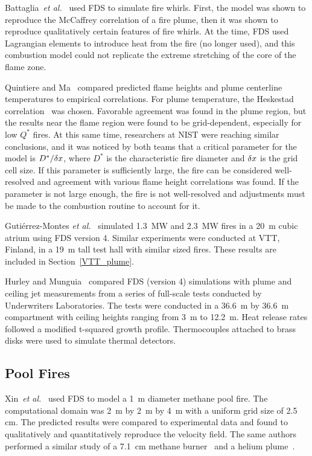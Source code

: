 Battaglia~{\em et al.}~\cite{Battaglia:1} used FDS to simulate fire whirls.  First, the model was shown to reproduce the McCaffrey correlation of a fire plume,  then it was shown to reproduce qualitatively certain features of fire whirls. At the time, FDS used Lagrangian elements to introduce heat from the fire (no longer used), and this combustion model could not replicate the extreme stretching of the core of the flame zone.

Quintiere and Ma~\cite{Ma:2,Ma:3} compared predicted flame heights and plume centerline temperatures to empirical correlations.  For plume temperature,  the Heskestad  correlation~\cite{SFPE:Heskestad} was chosen. Favorable agreement was found in the plume region, but the results near the flame region were found to be grid-dependent, especially for low $Q^*$ fires. At this same time, researchers at NIST were reaching similar conclusions, and it was noticed by both teams that a critical parameter for the model is $D^*/\delta x$, where $D^*$ is the characteristic fire diameter and $\delta x$ is the grid cell size. If this parameter is sufficiently large, the fire can be considered well-resolved and agreement with various flame height correlations was found. If the parameter is not large enough, the fire is not well-resolved and adjustments must be made to the combustion routine to account for it.

Guti\'{e}rrez-Montes {\em et al.}~\cite{Gutierrez:Building_and_Environment} simulated 1.3~MW and 2.3~MW fires in a 20~m cubic atrium using FDS version 4. Similar experiments were conducted at VTT, Finland, in a 19~m tall test hall with similar sized fires. These results are included in Section~\ref{VTT_plume}.

Hurley and Munguia~\cite{Hurley:GCR09-921,Hurley:JFPE2009} compared FDS (version 4) simulations with plume and ceiling jet measurements from a series of full-scale tests conducted by Underwriters Laboratories. The tests were conducted in a 36.6~m by 36.6~m compartment with ceiling heights ranging from 3~m to 12.2~m. Heat release rates followed a modified t-squared growth profile. Thermocouples attached to brass disks were used to simulate thermal detectors.




\subsection{Pool Fires}


Xin~{\em et al.}~\cite{Xin:JSS2005} used FDS to model a 1~m diameter methane pool fire. The computational domain was 2~m by 2~m by 4~m with a uniform grid size of 2.5 cm. The predicted results were compared to  experimental data and found  to qualitatively and quantitatively reproduce  the velocity field.  The same authors performed a similar study of a 7.1~cm methane burner~\cite{Xin:CF2005} and a helium plume~\cite{Xin:CS2002}.

